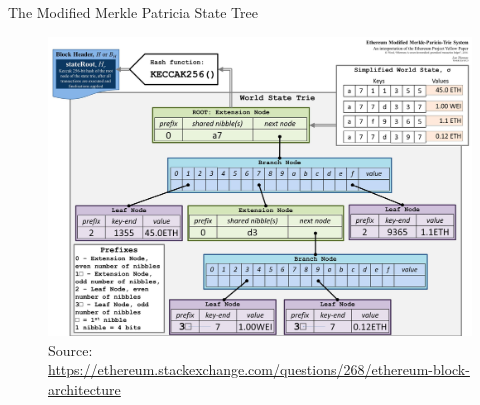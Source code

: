 \documentclass[handout]{beamer}
\begin{document}
\begin{frame}{The Modified Merkle Patricia State Tree}
\vspace{1em}
\captionsetup[figure]{font=tiny,labelformat=empty}
\begin{figure}[htp]
\centering
\includegraphics[scale= 0.5]{../assets/images/modified_merkle_patricia_state_tree.jpg}
      \caption{{\tiny Source: \link \url{https://ethereum.stackexchange.com/questions/268/ethereum-block-architecture}}}\label{fig:2}
\end{figure}

		
\end{frame}
\end{document}
